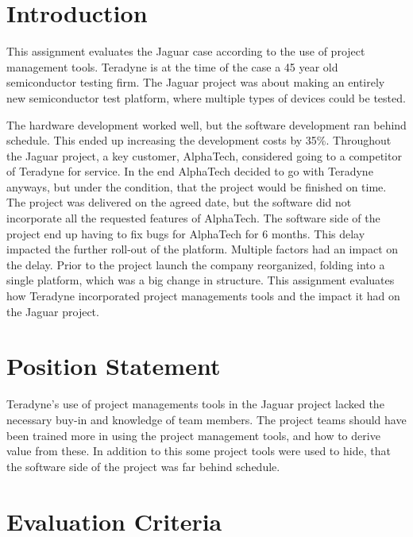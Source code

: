 \section{Introduction}
This assignment evaluates the Jaguar case according to the use of project management tools. Teradyne is at the time of the case a 45 year old semiconductor testing firm. The Jaguar project was about making an entirely new semiconductor test platform, where multiple types of devices could be tested.

The hardware development worked well, but the software development ran behind schedule. This ended up increasing the development costs by 35\%. Throughout the Jaguar project, a key customer, AlphaTech, considered going to a competitor of Teradyne for service. In the end AlphaTech decided to go with Teradyne anyways, but under the condition, that the project would be finished on time. The project was delivered on the agreed date, but the software did not incorporate all the requested features of AlphaTech. The software side of the project end up having to fix bugs for AlphaTech for 6 months. This delay impacted the further roll-out of the platform. Multiple factors had an impact on the delay. Prior to the project launch the company reorganized, folding into a single platform, which was a big change in structure. This assignment evaluates how Teradyne incorporated project managements tools and the impact it had on the Jaguar project.


\section{Position Statement}



Teradyne's use of project managements tools in the Jaguar project lacked the necessary buy-in and knowledge of team members. The project teams should have been trained more in using the project management tools, and how to derive value from these. In addition to this some project tools were used to hide, that the software side of the project was far behind schedule.



\section{Evaluation Criteria}

